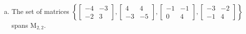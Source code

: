 \begin{exerciseAnswer}
\begin{enumerate}[(a)]
\item The set of matrices \( \left\{ \left[\begin{array}{cc}
-4 & -3 \\
-2 & 3
\end{array}\right] , \left[\begin{array}{cc}
4 & 4 \\
-3 & -5
\end{array}\right] , \left[\begin{array}{cc}
-1 & -1 \\
0 & 4
\end{array}\right] , \left[\begin{array}{cc}
-3 & -2 \\
-1 & 4
\end{array}\right] \right\} \) spans \(\mathrm{M}_{2,2}\). 
\end{enumerate}
    
\end{exerciseAnswer}
    
